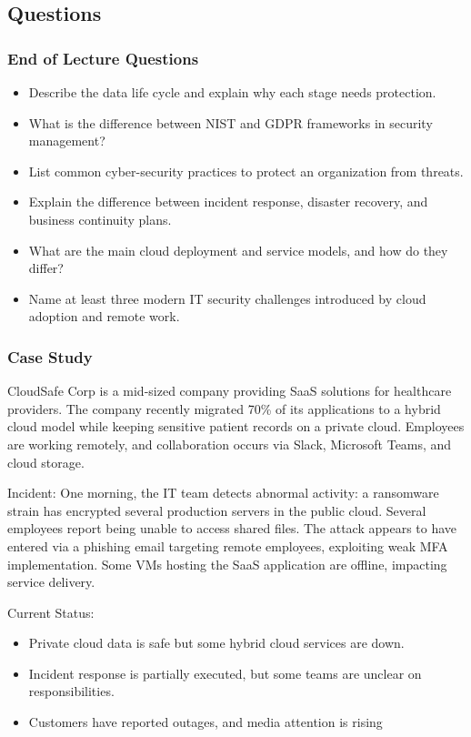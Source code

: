 \subsection{Questions}

\subsubsection{End of Lecture Questions}

\begin{itemize}
    \item Describe the data life cycle and explain why each stage needs protection.
    \item What is the difference between NIST and GDPR frameworks in security management?
    \item List common cyber-security practices to protect an organization from threats.
    \item Explain the difference between incident response, disaster recovery, and business continuity plans.
    \item What are the main cloud deployment and service models, and how do they differ?
    \item Name at least three modern IT security challenges introduced by cloud adoption and remote work.
\end{itemize}

\subsubsection{Case Study}

\indent 

CloudSafe Corp is a mid-sized company providing SaaS solutions for healthcare providers. The company recently migrated 70\% of its applications to a hybrid cloud model while keeping sensitive patient records on a private cloud. Employees are working remotely, and collaboration occurs via Slack, Microsoft Teams, and cloud storage.

Incident: One morning, the IT team detects abnormal activity: a ransomware strain has encrypted several production servers in the public cloud. Several employees report being unable to access shared files. The attack appears to have entered via a phishing email targeting remote employees, exploiting weak MFA implementation. Some VMs hosting the SaaS application are offline, impacting service delivery.

Current Status:

\begin{itemize}
    \item Private cloud data is safe but some hybrid cloud services are down.
    \item Incident response is partially executed, but some teams are unclear on responsibilities.
    \item Customers have reported outages, and media attention is rising
\end{itemize}

